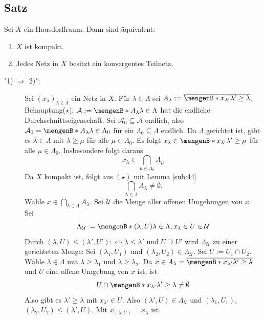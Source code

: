 \subsection[Satz: Charakterisierung von Kompaktheit durch konvergente Teilnetze]{Satz} %
\label{sub:45}
Sei $X$ ein Hausdorffraum. Dann sind äquivalent:
	\begin{enumerate}[1)]
		\item $X$ ist kompakt.
		\item Jedes Netz in $X$ besitzt ein konvergentes Teilnetz.
	\end{enumerate}
\begin{description}
	\item["1) $\Rightarrow $ 2)":] Sei $(x_\lambda )_{\lambda  \in \Lambda}$ ein Netz in $X$. Für $\lambda  \in \Lambda$ sei 
	$A_\lambda := \overline{\set[x_{\lambda'}]{\lambda '  \ge \lambda } }$. \\
	Behauptung($\star$): $\mathcal{A} := \set[A_\lambda ]{\lambda  \in \Lambda}  $ hat die endliche Durchschnittseigenschaft. Sei 
	$\mathcal{A}_0 \subseteq \mathcal{A}$ endlich, also
	$\mathcal{A}_0 = \set[A_\lambda ]{\lambda \in \Lambda_0}  $ für ein $\Lambda_0 \subseteq \Lambda$ endlich. Da $\Lambda$ gerichtet ist, gibt es $\lambda \in \Lambda$ mit
	$\lambda \ge \mu$ für alle $\mu \in \Lambda_0$. Es folgt $x_\lambda \in \set[x_{\lambda'}]{\lambda ' \ge \mu} $ für alle $\mu \in \Lambda_0$. Insbesondere folgt daraus 
	\[
		x_\lambda \in \bigcap_{\mu \in \Lambda_0} A_\mu
	\]
	Da $X$ kompakt ist, folgt aus $(\star)$ mit Lemma \ref{sub:44}
	\[
		\bigcap_{\lambda  \in \Lambda} A_\lambda \not= \emptyset.
	\]
	Wähle $x \in \bigcap_{\lambda  \in \Lambda} A_\lambda$. Sei $\mathcal{U} $ die Menge aller offenen Umgebungen von $x$. Sei 
	\[
		\Lambda_\mathcal{U} := \set[(\lambda , U)]{\lambda \in \Lambda, x_\lambda \in U \in \mathcal{U}}
	\]
	Durch $(\lambda , U) \le (\lambda', U') :\Leftrightarrow \lambda \le \lambda'$ und $U \supseteq U'$ wird $\Lambda_\mathcal{U}$ zu einer gerichteten Menge: 
	Sei $(\lambda_1, U_1)$ und $(\lambda _2, U_2) \in \Lambda_\mathcal{U}$. Sei $U := U_1 \cap U_2$. Wähle $\lambda \in \Lambda$ mit $\lambda \ge \lambda_1$ und 
	$\lambda  \ge \lambda_2$. Da $x \in A_\lambda = \overline{\set[x_{\lambda'}]{\lambda' \ge \lambda}} $ und $U$ eine offene Umgebung von $x$ ist, ist 
	\[
		U \cap \set[x_{\lambda'}]{\lambda'  \ge \lambda } \not= \emptyset
	\]
	Also gibt es $\lambda' \ge \lambda $ mit $x_{\lambda'} \in U$.
	Also $(\lambda', U) \in \Lambda_\mathcal{U} $ und $(\lambda_1, U_1)$, $(\lambda_2, U_2) \le (\lambda', U)$. Mit $x_{(\lambda , U)} = x_\lambda $ ist 

\end{description}
